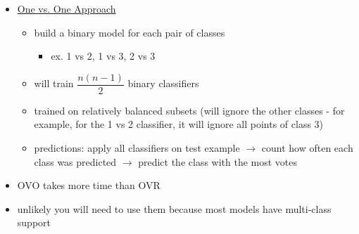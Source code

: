 \documentclass[10.5pt,a4paper, fleqn, dvipsnames]{article}
\begin{document}
\begin{itemize}
\begin{itemize}
        \end{itemize}
        \item \ul{One vs. One Approach}
        \begin{itemize}
            \item build a binary model for each pair of classes 
            \begin{itemize}[leftmargin = 2em]
                \item ex. 1 vs 2, 1 vs 3, 2 vs 3
            \end{itemize}
            \item will train $\dfrac{n(n-1)}{2}$ binary classifiers 
            \item trained on relatively balanced subsets (will ignore the other classes - for example, for the 1 vs 2 classifier, it will ignore all points of class 3)
            \item predictions: apply all classifiers on test example $\rightarrow$ count how often each class was predicted $\rightarrow$ predict the class with the most votes
        \end{itemize}
        \item OVO takes more time than OVR
        \item unlikely you will need to use them because most models have multi-class support
\end{itemize}
\end{document}
